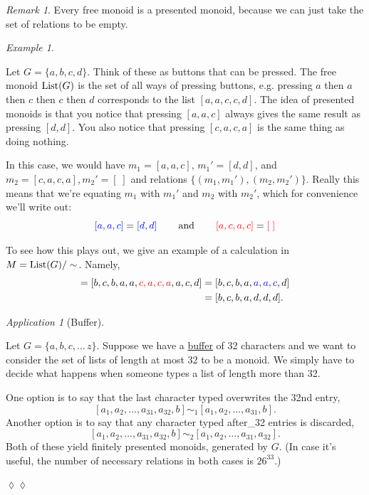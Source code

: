 \documentclass{book}
\def\tn{\textnormal}
\def\List{\tn{List}}
\def\hsp{\hspace{.3in}}
\theoremstyle{remark}
\newtheorem{remark}[subsubsection]{Remark}
\newtheorem{example}[subsubsection]{Example}
\newtheorem{app}[subsubsection]{Application}
\newenvironment{application}{\begin{app}}{\hspace*{\fill}$\lozenge\lozenge$\end{app}}
\theoremstyle{definition}
\begin{document}
\begin{remark}

Every free monoid is a presented monoid, because we can just take the set of relations to be empty.

\end{remark}

\begin{example}\label{ex:presented monoid}

Let $G=\{a,b,c,d\}$. Think of these as buttons that can be pressed. The free monoid $\List(G)$ is the set of all ways of pressing buttons, e.g. pressing $a$ then $a$ then $c$ then $c$ then $d$ corresponds to the list $[a,a,c,c,d]$. The idea of presented monoids is that you notice that pressing $[a,a,c]$ always gives the same result as pressing $[d,d]$. You also notice that pressing $[c,a,c,a]$ is the same thing as doing nothing. 

In this case, we would have $m_1=[a,a,c]$, $m_1'=[d,d]$, and $m_2=[c,a,c,a], m_2'=[\;]$ and relations $\{(m_1,m_1'), (m_2,m_2')\}$. Really this means that we're equating $m_1$ with $m_1'$ and $m_2$ with $m_2'$, which for convenience we'll write out:
$${\color{blue}{[a,a,c]}}={\color{blue}{[d,d]}}\hsp\tn{and}\hsp{\color{red}{[a,c,a,c]}}={\color{red}{[\;]}}
$$ 

To see how this plays out, we give an example of a calculation in $M=\List(G)/\sim$. Namely, 
\begin{align*}
[b,c,b,{\color{blue}{d,d}},a,c,a,a,c,d] = [b,c,b,a,a,{\color{red}{c,a,c,a}},a,c,d] &= [b,c,b,a,{\color{blue}{a,a,c}},d]\\
&= [b,c,b,a,d,d,d].
\end{align*}

\end{example}

\begin{application}[Buffer]\label{app:buffer}

Let $G=\{a,b,c,\ldots\,z\}$. Suppose we have a \href{http://en.wikipedia.org/wiki/Data_buffer}{\text buffer} of 32 characters and we want to consider the set of lists of length at most 32 to be a monoid. We simply have to decide what happens when someone types a list of length more than 32. 

One option is to say that the last character typed overwrites the 32nd entry, $$[a_1,a_2,\ldots,a_{31},a_{32},b]\sim_1[a_1,a_2,\ldots,a_{31},b].$$ Another option is to say that any character typed after\_32 entries is discarded, $$[a_1,a_2,\ldots,a_{31},a_{32},b]\sim_2[a_1,a_2,\ldots,a_{31},a_{32}].$$ Both of these yield finitely presented monoids, generated by $G$. (In case it's useful, the number of necessary relations in both cases is $26^{33}$.)

\end{application}
\end{document}
